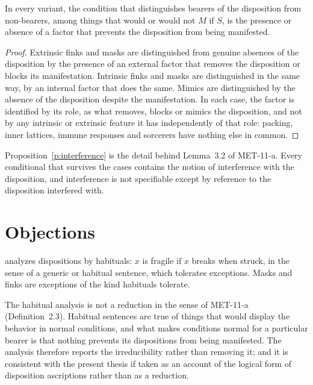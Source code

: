 \documentclass{situationist-preprint}
\begin{document}
\begin{proposition}\label{p:interference}
In every variant, the condition that distinguishes bearers of the disposition from non-bearers, among things that would or would not $M$ if $S$, is the presence or absence of a factor that prevents the disposition from being manifested.
\end{proposition}

\begin{proof}
Extrinsic finks and masks are distinguished from genuine absences of the disposition by the presence of an external factor that removes the disposition or blocks its manifestation. Intrinsic finks and masks are distinguished in the same way, by an internal factor that does the same. Mimics are distinguished by the absence of the disposition despite the manifestation. In each case, the factor is identified by its role, as what removes, blocks or mimics the disposition, and not by any intrinsic or extrinsic feature it has independently of that role: packing, inner lattices, immune responses and sorcerers have nothing else in common.
\end{proof}

Proposition~\ref{p:interference} is the detail behind Lemma~3.2 of MET-11-a. Every conditional that survives the cases contains the notion of interference with the disposition, and interference is not specifiable except by reference to the disposition interfered with.

\section{Objections}

\begin{objection}
\citet{Fara2005} analyzes dispositions by habituals: $x$ is fragile if $x$ breaks when struck, in the sense of a generic or habitual sentence, which tolerates exceptions. Masks and finks are exceptions of the kind habituals tolerate.
\end{objection}

\begin{reply}
The habitual analysis is not a reduction in the sense of MET-11-a (Definition~2.3). Habitual sentences are true of things that would display the behavior in normal conditions, and what makes conditions normal for a particular bearer is that nothing prevents its dispositions from being manifested. The analysis therefore reports the irreducibility rather than removing it; and it is consistent with the present thesis if taken as an account of the logical form of disposition ascriptions rather than as a reduction.
\end{reply}
\end{document}
